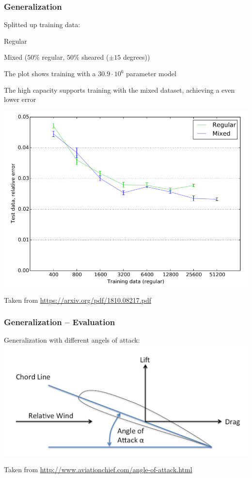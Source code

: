 \begin{frame}
    \frametitle{Generalization}
    \vspace*{0.8cm}
\begin{multicols}{2}
    Splitted up training data:
    \begin{PraesentationAufzaehlung}
		\item Regular
		\item Mixed ($50\%$ regular, $50\%$ sheared ($\pm 15$ degrees))
	\end{PraesentationAufzaehlung}
	
	The plot shows training with a $30.9 \cdot 10^6$ parameter model
	
	The high capacity supports training with the mixed dataset, \newline
	achieving a even lower error
	
	 
	
    \vfill\columnbreak
	\includegraphics[width=\columnwidth, height=.6\textheight]{./Ressourcen/Praesentation/Bilder/generaliz_plot.png}
\end{multicols}
\vspace*{-1.4cm}
    Taken from \url{https://arxiv.org/pdf/1810.08217.pdf}
\end{frame}
\clearpage



\begin{frame}
    \frametitle{Generalization -- Evaluation}
    \vspace*{0.8cm}

Generalization with different angels of attack: \\[\baselineskip]

\includegraphics[width=.5\textwidth, height=.4\textheight]{./Ressourcen/Praesentation/Bilder/aoa.png}%
\newline

Taken from \url{http://www.aviationchief.com/angle-of-attack.html}

\end{frame}
\clearpage

